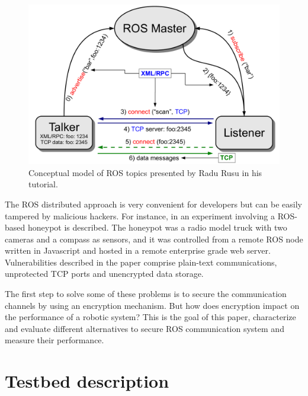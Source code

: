 \documentclass[journal,twoside]{JoPhA}
\begin{document}
\begin{figure}[ht]
	\centering
	\includegraphics[width=.495\textwidth]{ros_tutorial.png}
	\caption{Conceptual model of ROS topics presented by Radu Rusu in his tutorial\cite{rusu2010ros}.}
	\label{fig:Conceptual_ROS_topics_model}
\end{figure}



The ROS distributed approach is very convenient for developers but can be easily tampered by malicious hackers. For instance, in \cite{McClean2013} an experiment involving a ROS-based honeypot is described. The honeypot was a radio model truck with two cameras and a compass as sensors, and it was controlled from a remote ROS node written in Javascript and hosted in a remote enterprise grade web server. Vulnerabilities described in the paper comprise plain-text communications, unprotected TCP ports and unencrypted data storage.

The first step to solve some of these problems is to secure the communication channels by using an encryption mechanism. But how does encryption impact on the performance of a robotic system? This is the goal of this paper, characterize and evaluate different alternatives to secure ROS communication system and measure their performance.




\section{Testbed description}
\label{Description}
 
\end{document}
